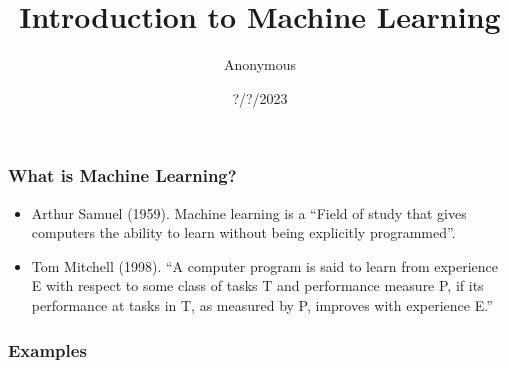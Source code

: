 \documentclass{beamer}
\title{Introduction to Machine Learning}
\author{Anonymous}
\institute{Aarhus University - Department of Mechanical and Production Engineering}
\date{?/?/2023}
\begin{document}
	
	\frame{\titlepage}
	
	\begin{frame}
		\frametitle{What is Machine Learning?}
		\begin{itemize}
			\item Arthur Samuel (1959). Machine learning is a “Field of study that gives computers the ability to learn without being explicitly programmed”. \pause
			\item Tom Mitchell (1998). “A computer program is said to learn from experience E with respect to some class of tasks T and performance measure P, if its performance at tasks in T, as measured by P, improves with experience E.”
		\end{itemize}
		
	\end{frame}

	\begin{frame}
		\frametitle{Examples}
	\end{frame}
	
\end{document}
